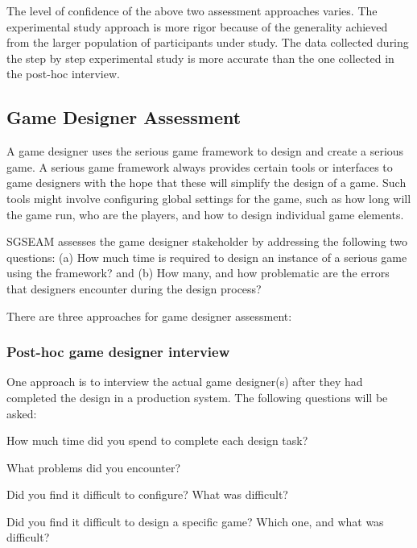 The level of confidence of the above two assessment approaches varies. The experimental study
approach is more rigor because of the generality achieved from the larger population of
participants under study. The data collected during the step by step experimental study is more
accurate than the one collected in the post-hoc interview.

\subsection{Game Designer Assessment}

A game designer uses the serious game framework to design and create a serious game.
A serious game framework always provides certain tools or interfaces to game designers
with the hope that these will simplify the design of a game. Such tools might involve
configuring global settings for the game, such as how long will the game run, who are the
players, and how to design individual game elements.

SGSEAM assesses the game designer stakeholder by addressing the following two questions: (a) How
much time is required to design an instance of a serious game using the framework? and (b) How
many, and how problematic are the errors that designers encounter during the design process?

There are three approaches for game designer assessment:

\subsubsection{Post-hoc game designer interview}
\label{Post-hoc game designer interview}

One approach is to interview the actual game designer(s) after they had completed the design in a production system. The following questions will be asked:\\
 
\begin{compactitem}
\item How much time did you spend to complete each design task?
\item What problems did you encounter?
\item Did you find it difficult to configure? What was difficult?
\item Did you find it difficult to design a specific game? Which one, and what was difficult?\\
\end{compactitem}


